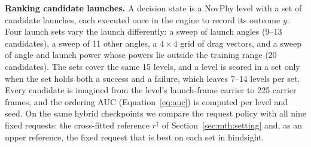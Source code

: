 \textbf{Ranking candidate launches.} A decision state is a NovPhy level with a set of candidate launches, each executed once in the engine to record its outcome $y$. Four launch sets vary the launch differently: a sweep of launch angles (9--13 candidates), a sweep of 11 other angles, a $4\times4$ grid of drag vectors, and a sweep of angle and launch power whose powers lie outside the training range (20 candidates). The sets cover the same 15 levels, and a level is scored in a set only when the set holds both a success and a failure, which leaves 7--14 levels per set. Every candidate is imagined from the level's launch-frame carrier to 225 carrier frames, and the ordering AUC (Equation~\ref{eq:auc}) is computed per level and seed. On the same hybrid checkpoints we compare the request policy with all nine fixed requests: the cross-fitted reference $r^\dagger$ of Section~\ref{sec:mth:setting} and, as an upper reference, the fixed request that is best on each set in hindsight.

